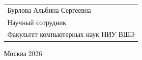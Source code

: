 \begin{titlepage}
{
\begin{tabular}{l}
Бурлова Альбина Сергеевна\\
Научный сотрудник\\
Факультет компьютерных наук НИУ ВШЭ 
\end{tabular}}





\vspace{\fill}

\begin{center}
Москва 2026
\end{center}

\end{titlepage}
